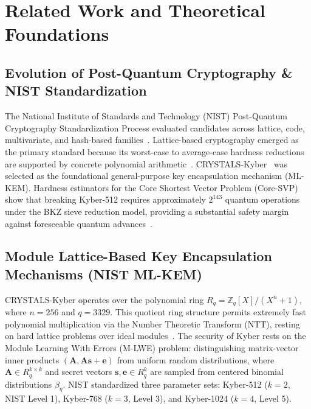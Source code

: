 \documentclass[sn-mathphys,Numbered]{sn-jnl}%
\theoremstyle{thmstyleone}%
\theoremstyle{thmstyletwo}%
\theoremstyle{thmstylethree}%
\begin{document}
\section{Related Work and Theoretical Foundations}\label{sec:related}

\subsection{\textbf{Evolution of Post-Quantum Cryptography \& NIST Standardization}}
The National Institute of Standards and Technology (NIST) Post-Quantum Cryptography Standardization Process evaluated candidates across lattice, code, multivariate, and hash-based families~\cite{nist2024pqc}. Lattice-based cryptography emerged as the primary standard because its worst-case to average-case hardness reductions are supported by concrete polynomial arithmetic~\cite{bernstein2017post}. CRYSTALS-Kyber~\cite{bos2018crystals} was selected as the foundational general-purpose key encapsulation mechanism (ML-KEM). Hardness estimators for the Core Shortest Vector Problem (Core-SVP) show that breaking Kyber-512 requires approximately $2^{143}$ quantum operations under the BKZ sieve reduction model, providing a substantial safety margin against foreseeable quantum advances~\cite{alagic2022status}.

\subsection{\textbf{Module Lattice-Based Key Encapsulation Mechanisms (NIST ML-KEM)}}
CRYSTALS-Kyber operates over the polynomial ring $R_q = \mathbb{Z}_q[X]/(X^n + 1)$, where $n=256$ and $q=3329$. This quotient ring structure permits extremely fast polynomial multiplication via the Number Theoretic Transform (NTT), resting on hard lattice problems over ideal modules~\cite{regev2009lattices,lyubashevsky2013ideal,peikert2016decade}. The security of Kyber rests on the Module Learning With Errors (M-LWE) problem: distinguishing matrix-vector inner products $(\mathbf{A}, \mathbf{A}\mathbf{s} + \mathbf{e})$ from uniform random distributions, where $\mathbf{A} \in R_q^{k \times k}$ and secret vectors $\mathbf{s}, \mathbf{e} \in R_q^k$ are sampled from centered binomial distributions $\beta_\eta$. NIST standardized three parameter sets: Kyber-512 ($k=2$, NIST Level 1), Kyber-768 ($k=3$, Level 3), and Kyber-1024 ($k=4$, Level 5).
\end{document}
